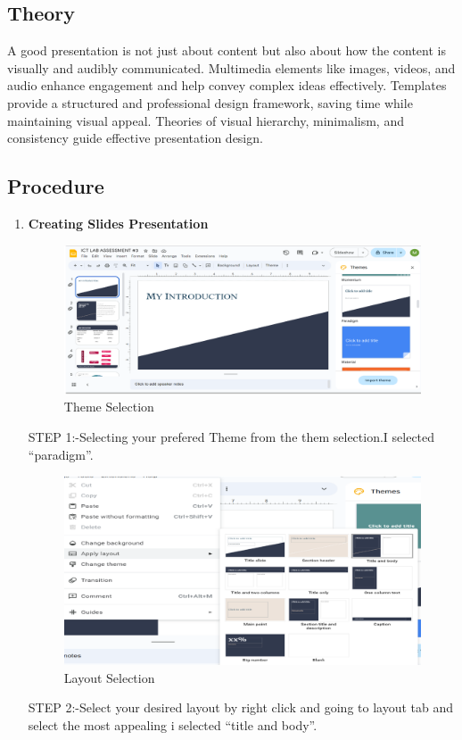 \documentclass[a4paper,9pt]{article}
\begin{document}
\subsection{Theory}
A good presentation is not just about content but also about how the content is visually and audibly communicated. Multimedia elements like images, videos, and audio enhance engagement and help convey complex ideas effectively. Templates provide a structured and professional design framework, saving time while maintaining visual appeal. Theories of visual hierarchy, minimalism, and consistency guide effective presentation design.
\subsection{Procedure}
\begin{enumerate}
	\item \textbf{Creating Slides Presentation}
	
	\begin{figure}[H]
		\centering
		\includegraphics[width=0.8\linewidth]{4.1.png}
		\caption{Theme Selection}
	\end{figure}
	STEP 1:-Selecting your prefered Theme from the them selection.I selected “paradigm”.
	\begin{figure}[H]
		\centering
		\includegraphics[width=0.8\linewidth]{4.2.png}
		\caption{Layout Selection}
	\end{figure}
	STEP 2:-Select your desired layout by right click and going to layout tab and select the
	most appealing i selected “title and body”.
	

\end{enumerate}
\end{document}
